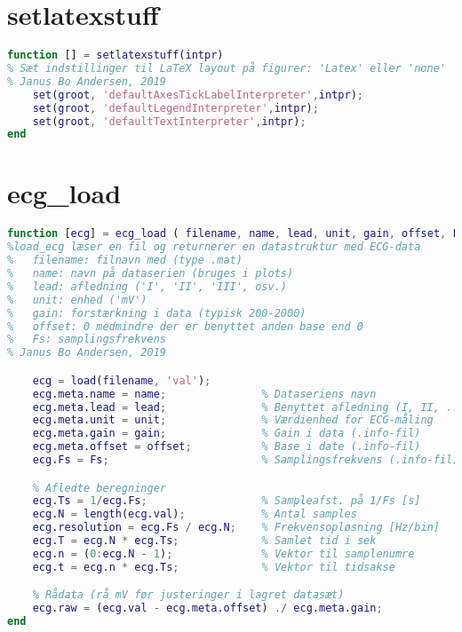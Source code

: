 \documentclass[a4paper]{report}
\begin{document}
\section{setlatexstuff}

        
\begin{lstlisting}[language=Matlab, style=Matlab-editor]
function [] = setlatexstuff(intpr)
% Sæt indstillinger til LaTeX layout på figurer: 'Latex' eller 'none'
% Janus Bo Andersen, 2019
    set(groot, 'defaultAxesTickLabelInterpreter',intpr);
    set(groot, 'defaultLegendInterpreter',intpr);
    set(groot, 'defaultTextInterpreter',intpr);
end
\end{lstlisting}



\section{ecg\_load}

        
\begin{lstlisting}[language=Matlab, style=Matlab-editor]
function [ecg] = ecg_load ( filename, name, lead, unit, gain, offset, Fs )
%load_ecg læser en fil og returnerer en datastruktur med ECG-data
%   filename: filnavn med (type .mat)
%   name: navn på dataserien (bruges i plots)
%   lead: afledning ('I', 'II', 'III', osv.)
%   unit: enhed ('mV')
%   gain: forstærkning i data (typisk 200-2000)
%   offset: 0 medmindre der er benyttet anden base end 0
%   Fs: samplingsfrekvens
% Janus Bo Andersen, 2019

    ecg = load(filename, 'val');
    ecg.meta.name = name;               % Dataseriens navn
    ecg.meta.lead = lead;               % Benyttet afledning (I, II, ...)
    ecg.meta.unit = unit;               % Værdienhed for ECG-måling
    ecg.meta.gain = gain;               % Gain i data (.info-fil)
    ecg.meta.offset = offset;           % Base i date (.info-fil)
    ecg.Fs = Fs;                        % Samplingsfrekvens (.info-fil)

    % Afledte beregninger
    ecg.Ts = 1/ecg.Fs;                  % Sampleafst. på 1/Fs [s]
    ecg.N = length(ecg.val);            % Antal samples
    ecg.resolution = ecg.Fs / ecg.N;    % Frekvensopløsning [Hz/bin]
    ecg.T = ecg.N * ecg.Ts;             % Samlet tid i sek
    ecg.n = (0:ecg.N - 1);              % Vektor til samplenumre
    ecg.t = ecg.n * ecg.Ts;             % Vektor til tidsakse

    % Rådata (rå mV før justeringer i lagret datasæt)
    ecg.raw = (ecg.val - ecg.meta.offset) ./ ecg.meta.gain;
end
\end{lstlisting}
\end{document}
